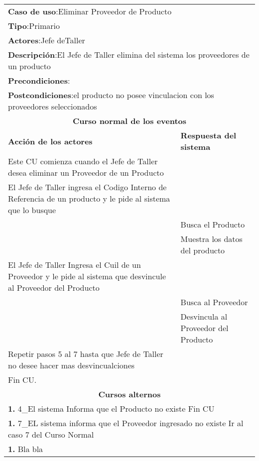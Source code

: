 \begin{longtable}{ |p{8cm}|p{8cm}| }
		\hline
		\multicolumn{2}{|p{16cm}|}{\textbf{Caso de uso}:Eliminar Proveedor de Producto }\\
		\multicolumn{2}{|p{16cm}|}{\textbf{Tipo}:Primario }\\
		\multicolumn{2}{|p{16cm}|}{\textbf{Actores}:Jefe deTaller }\\
		\multicolumn{2}{|p{16cm}|}{\textbf{Descripción}:El Jefe de Taller elimina del sistema los proveedores de un producto }\\
		\multicolumn{2}{|p{16cm}|}{\textbf{Precondiciones}: }\\
		\multicolumn{2}{|p{16cm}|}{\textbf{Postcondiciones}:el producto no posee vinculacion con los proveedores seleccionados }\\
		\hline
		\multicolumn{2}{|c|}{\textbf{Curso normal de los eventos}}\\
		\hline
		\textbf{Acción de los actores} & \textbf{Respuesta del sistema}\\
		\hline
			\inc Este CU comienza cuando el Jefe de Taller desea eliminar un Proveedor de un Producto & \\
			\hline
			\inc El Jefe de Taller ingresa el Codigo Interno de Referencia de un producto y le pide al sistema que lo busque & \\
			\hline
			& \inc Busca el Producto \\
			\hline
			& \inc Muestra los datos del producto \\
			\hline
			\inc El Jefe de Taller Ingresa el Cuil de un Proveedor y le pide al sistema que desvincule al Proveedor del Producto & \\
			\hline
			& \inc Busca al Proveedor \\
			\hline
			& \inc Desvincula al Proveedor del Producto \\
			\hline
			\inc Repetir pasos 5 al 7 hasta que Jefe de Taller no desee hacer mas desvincualciones  & \\
			\hline
			\inc Fin CU. & \\
		\hline
		\multicolumn{2}{|c|}{\textbf{Cursos alternos}}\\
		\hline
		\multicolumn{2}{|p{16cm}|}{\textbf{1. }4_El sistema Informa que el Producto no existe Fin CU}\\
		\hline
		\multicolumn{2}{|p{16cm}|}{\textbf{1. }7_EL sistema informa que el Proveedor ingresado no existe Ir al caso 7 del Curso Normal}\\
		\hline
		\multicolumn{2}{|p{16cm}|}{\textbf{1. }Bla bla }\\
		\hline	
	\end{longtable}